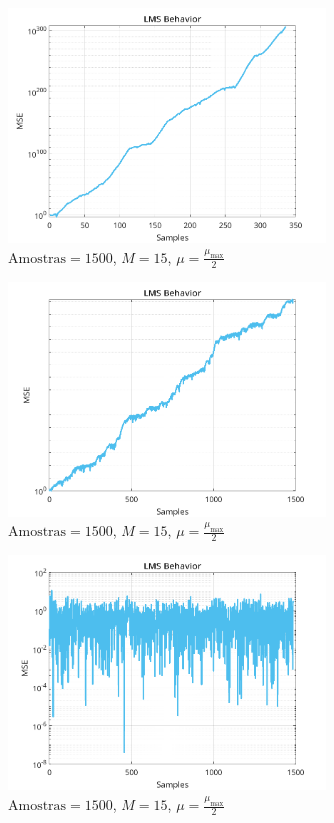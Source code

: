 \documentclass[a4paper,10pt]{article}
\begin{document}
\begin{enumerate}
				\begin{figure}[!ht]
					\centering
					\includegraphics[width=0.75\textwidth]{figs/L3Q5_mu_2.png}
					\caption{$\text{Amostras} = 1500$, $M = 15$, $\mu = \frac{\mu_{\text{max}}}{2}$}
					\label{fig:mu_2}
				\end{figure}

				\begin{figure}[!ht]
					\centering
					\includegraphics[width=0.75\textwidth]{figs/L3Q5_mu_10.png}
					\caption{$\text{Amostras} = 1500$, $M = 15$, $\mu = \frac{\mu_{\text{max}}}{2}$}
					\label{fig:mu_10}
				\end{figure}

				\begin{figure}[!ht]
					\centering
					\includegraphics[width=0.75\textwidth]{figs/L3Q5_mu_50.png}
					\caption{$\text{Amostras} = 1500$, $M = 15$, $\mu = \frac{\mu_{\text{max}}}{2}$}
					\label{fig:mu_50}
				\end{figure}


\end{enumerate}
\end{document}
